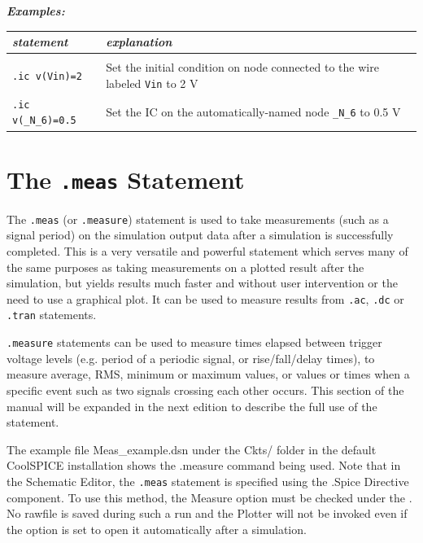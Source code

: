 \textbf{\textit{Examples:}}

\begin{tabular}{p{5cm}p{8cm}}
\textit{statement} & \textit{explanation} \\ \hline \\ \vspace{-0.8\parskip} 
\texttt{.ic v(Vin)=2} & {\small Set the initial condition on node connected to the wire labeled \texttt{Vin} to 2 V} \\
\texttt{.ic v(\_N\_6)=0.5} & {\small Set the IC on the {automatically-named node \texttt{\_N\_6}} to 0.5 V}
\end{tabular}

\section{The \texttt{.meas} Statement}
\label{sec_satco_measstatement}


The \texttt{.meas} (or \texttt{.measure}) statement is used to take measurements (such as a signal period) on the simulation output data after a simulation is successfully completed.  This is a very versatile and powerful statement which serves many of the same purposes as taking measurements on a plotted result after the simulation, but yields results much faster and without user intervention or the need to use a graphical plot.  It can be used to measure results from \texttt{.ac}, \texttt{.dc} or \texttt{.tran} statements.  

\texttt{.measure} statements can be used to measure times elapsed between trigger voltage levels (e.g. period of a periodic signal, or rise/fall/delay times), to measure average, RMS, minimum or maximum values, or values or times when a specific event such as two signals crossing each other occurs.  This section of the  manual will be expanded in the next edition to describe the full use of the statement.  

The example file \textsf{Meas\_example.dsn} under the \textsf{Ckts/} folder in the default CoolSPICE installation shows the \textsf{.measure} command being used.  Note that in the Schematic Editor, the \texttt{.meas} statement is specified using the \textsf{.Spice Directive} component.  To use this method, the \textsf{Measure} option must be checked under the .  No rawfile is saved during such a run and the Plotter will not be invoked even if the option is set to open it automatically after a simulation.  


